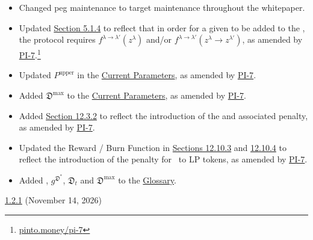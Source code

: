 \documentclass[class=article, crop=false]{standalone}
\begin{document}
\begin{itemize}[topsep=0pt, itemsep=3pt,leftmargin=16pt]
    \begin{itemize}
        \item Changed peg maintenance to target maintenance throughout the whitepaper.    
        \item Updated \hyperlink{subsubsection.5.1.4}{Section 5.1.4} to reflect that in order for a given  to be added to the , the protocol requires $f^{\lambda \rightarrow \lambda'}(z^{\lambda})$ and/or $f^{\lambda \rightarrow \lambda'}(z^{\lambda} \rightarrow z^{\lambda'})$, as amended by \href{https://pinto.money/pi-7}{PI-7}.\footnote{\href{https://pinto.money/pi-7}{pinto.money/pi-7}} 
        \item Updated $P^{\text{upper}}$ in the \hyperlink{subsection.12.1}{Current Parameters}, as amended by \href{https://pinto.money/pi-7}{PI-7}.
        \item Added $\mathfrak{D}^{\text{max}}$ to the \hyperlink{subsection.12.1}{Current Parameters}, as amended by \href{https://pinto.money/pi-7}{PI-7}.
        \item Added \hyperlink{subsubsection.12.3.2}{Section 12.3.2} to reflect the introduction of the   and associated  penalty, as amended by \href{https://pinto.money/pi-7}{PI-7}.
        \item Updated the  Reward / Burn Function in \href{https://github.com/pinto-org/whitepaper/blob/master/version-history/pinto1_2_0.pdf}{Sections 12.10.3} and \href{https://github.com/pinto-org/whitepaper/blob/master/version-history/pinto1_2_0.pdf}{12.10.4} to reflect the introduction of the  penalty for   \Pinto\ to  LP tokens, as amended by \href{https://pinto.money/pi-7}{PI-7}.
        \item Added , $g^{\mathfrak{D}^{*}}$, $\mathfrak{D}_{t}$ and $\mathfrak{D}^{\text{max}}$ to the \href{https://github.com/pinto-org/whitepaper/blob/master/version-history/pinto1_2_0.pdf}{Glossary}. 
    \end{itemize}
    

    \begin{samepage}
    \item \href{https://github.com/pinto-org/whitepaper/blob/main/version-history/pinto1_2_1.pdf}{1.2.1} (November 14, 2026)


\end{samepage}
\end{itemize}
\end{document}
